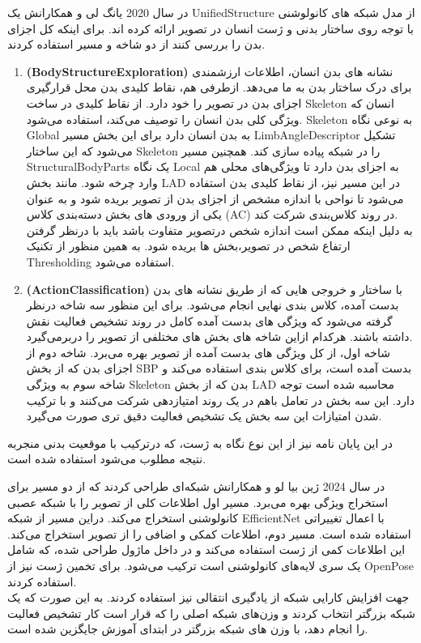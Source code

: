   در سال 2020 یانگ لی و همکارانش %
  \cite{Recognition_fusing_mutple_cue}
  یک %
\gls{UnifiedStructure}
  از مدل شبکه های کانولوشنی با توجه روی ساختار بدنی و ژست انسان در تصویر ارائه کرده اند. برای اینکه کل اجزای بدن را بررسی کنند از دو شاخه و مسیر استفاده کردند.
  \begin{enumerate}
  	\item \textbf{(\gls{BodyStructureExploration})}
  	نشانه های بدن انسان، اطلاعات ارزشمندی برای درک ساختار بدن به ما می‌دهد. ازطرفی هم، نقاط کلیدی بدن محل قرارگیری اجزای بدن در تصویر را خود دارد. از نقاط کلیدی در ساخت %
\gls{Skeleton}
  	انسان که ویژگی کلی بدن انسان را توصیف می‌کند،‌ استفاده ‌می‌شود.
 \gls{Skeleton}
  	 به نوعی نگاه %
\gls{Global}
  	به بدن انسان دارد برای این بخش مسیر %
\gls{LimbAngleDescriptor}
  	 تشکیل می‌شود که این ساختار 
  	  \gls{Skeleton}
  	  را در شبکه پیاده سازی کند. همچنین مسیر %
  	 \gls{StructuralBodyParts}
  	 یک نگاه %
  	 \gls{Local}
  	 به اجزای بدن دارد تا ویژگی‌های محلی هم وارد چرخه شود. مانند بخش LAD در این مسیر نیز، از نقاط کلیدی بدن استفاده می‌شود تا نواحی با اندازه مشخص از اجزای بدن از تصویر بریده شود و به عنوان یکی از ورودی های بخش دسته‌بندی کلاس (AC) در روند کلاس‌بندی شرکت کند.\\
  	 به دلیل اینکه ممکن است اندازه شخص درتصویر متفاوت باشد باید با درنظر گرفتن ارتفاع شخص در تصویر،بخش ها بریده شود. به همین منظور از تکنیک %
  	 \gls{Thresholding}
 استفاده می‌شود.
  	\item \textbf{(\gls{ActionClassification})}
  	  با ساختار و خروجی هایی که از طریق نشانه های بدن بدست آمده،‌ کلاس بندی نهایی انجام می‌شود. برای این منظور سه شاخه درنظر گرفته می‌شود که ویژگی های بدست آمده کامل در روند تشخیص فعالیت نقش داشته باشند. هرکدام ازاین شاخه های بخش های مختلفی از تصویر را دربرمی‌گیرد.\\
 شاخه اول،‌ از کل ویژگی های بدست آمده از تصویر بهره می‌برد. شاخه دوم از اجزای بدن که از بخش SBP بدست آمده است،‌ برای کلاس بندی استفاده می‌کند و شاخه سوم به ویژگی 
  \gls{Skeleton}
  بدن که از بخش LAD محاسبه شده است توجه دارد. این سه بخش در تعامل باهم در یک روند امتیاز‌دهی شرکت می‌کنند و با ترکیب شدن امتیازات این سه بخش یک تشخیص فعالیت دقیق تری صورت می‌گیرد. 
  \end{enumerate}
در این پایان نامه نیز از این نوع نگاه به ژست، که درترکیب با موقعیت بدنی منجربه نتیجه مطلوب می‌شود استفاده شده است.
   
   	در سال 2024 ژین بیا لو و همکارانش %
   \cite{a_key_points_assisted_net}
   شبکه‌ای طراحی کردند که از دو مسیر برای استخراج ویژگی بهره می‌برد. مسیر اول اطلاعات کلی از تصویر را با شبکه عصبی کانولوشنی استخراج می‌کند. دراین مسیر از شبکه EfficientNet با اعمال تغییراتی استفاده شده است. مسیر دوم،‌ اطلاعات کمکی و اضافی را از تصویر استخراج می‌کند. این اطلاعات کمی از ژست استفاده می‌کند و در داخل ماژول طراحی شده،‌ که شامل یک سری لایه‌های کانولوشنی است ترکیب می‌شود. برای تخمین ژست نیز از OpenPose استفاده کردند.\\
   جهت افزایش کارایی شبکه از یادگیری انتقالی نیز استفاده کردند. به این صورت که یک شبکه بزرگتر انتخاب کردند و وزن‌‌های شبکه اصلی را که قرار‌ است کار تشخیص فعالیت را انجام دهد، با وزن های شبکه بزرگتر در ابتدای آموزش جایگزین شده است. 
   
